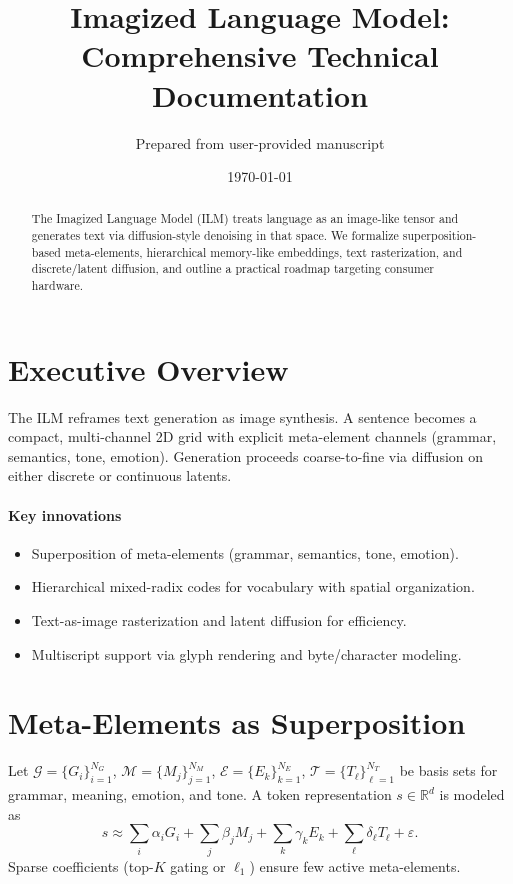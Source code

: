 \documentclass[11pt]{article}
\title{Imagized Language Model: Comprehensive Technical Documentation}
\author{Prepared from user-provided manuscript}
\date{\today}
\begin{document}
\maketitle

\begin{abstract}
The Imagized Language Model (ILM) treats language as an image-like tensor and generates text via diffusion-style denoising in that space. We formalize superposition-based meta-elements, hierarchical memory-like embeddings, text rasterization, and discrete/latent diffusion, and outline a practical roadmap targeting consumer hardware.
\end{abstract}

\tableofcontents

\section{Executive Overview}
The ILM reframes text generation as image synthesis. A sentence becomes a compact, multi-channel 2D grid with explicit meta-element channels (grammar, semantics, tone, emotion). Generation proceeds coarse-to-fine via diffusion on either discrete or continuous latents.

\paragraph{Key innovations}
\begin{itemize}[noitemsep,topsep=2pt]
  \item Superposition of meta-elements (grammar, semantics, tone, emotion).
  \item Hierarchical mixed-radix codes for vocabulary with spatial organization.
  \item Text-as-image rasterization and latent diffusion for efficiency.
  \item Multiscript support via glyph rendering and byte/character modeling.
\end{itemize}

\section{Meta-Elements as Superposition}
Let $\mathcal{G}{=}\{G_i\}_{i=1}^{N_G}$, $\mathcal{M}{=}\{M_j\}_{j=1}^{N_M}$, $\mathcal{E}{=}\{E_k\}_{k=1}^{N_E}$, $\mathcal{T}{=}\{T_\ell\}_{\ell=1}^{N_T}$ be basis sets for grammar, meaning, emotion, and tone. A token representation $s\in\mathbb{R}^d$ is modeled as
\begin{equation}
  s \approx \sum_{i} \alpha_i G_i + \sum_{j} \beta_j M_j + \sum_{k} \gamma_k E_k + \sum_{\ell} \delta_\ell T_\ell + \varepsilon.
\end{equation}
Sparse coefficients (top-$K$ gating or $\ell_1$) ensure few active meta-elements.
\end{document}
